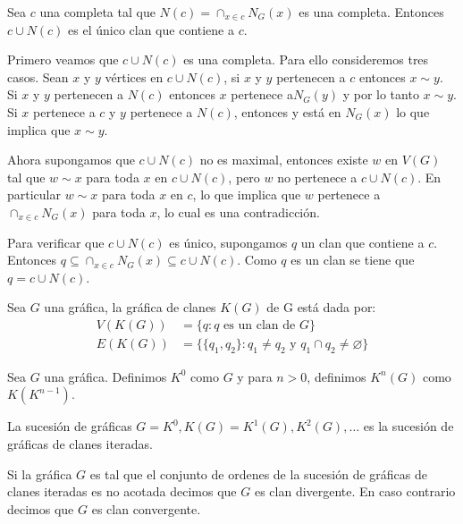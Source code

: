 \begin{Prop}
Sea $c$ una completa tal que $N(c) = \cap_{x\in c}N_G(x)$ es una completa. Entonces $c\cup N(c)$ es el único clan que contiene a $c$.
\end{Prop}
\begin{Dem}
Primero veamos que $c\cup N(c)$ es una completa. Para ello consideremos tres casos. Sean $x$ y $y$ vértices en $c\cup N(c)$, si $x$ y $y$ pertenecen a $c$ entonces $x\sim y$. Si $x$ y $y$ pertenecen a $N(c)$ entonces $x$ pertenece a$ N_G(y)$ y por lo tanto $x\sim y$. Si $x$ pertenece a $c$ y $y$ pertenece a $N(c)$, entonces y está en $N_G(x)$ lo que implica que $x\sim y$. 

Ahora supongamos que $c\cup N(c)$  no es maximal, entonces existe $w$ en $V(G)$ tal que $w\sim x$ para toda $x$ en $c\cup N(c)$, pero $w$ no pertenece a $c\cup N(c)$. En particular $w\sim x$ para toda $x$ en $c$, lo que implica que $w$ pertenece a $\cap_{x\in c}N_G(x)$ para toda $x$, lo cual es una contradicción.

Para verificar que $c\cup N(c)$ es único, supongamos $q$ un clan que contiene a $c$. Entonces $q\subseteq \cap_{x\in c}N_G(x)\subseteq c\cup N(c) $. Como $q$ es un clan se tiene que $q = c\cup N(c)$.
\end{Dem}

\begin{Defi}
Sea $G$ una gráfica, la gráfica de clanes $K(G)$ de G está dada por:
\begin{align*}
V(K(G))&=\{q: q \text{ es un clan de } G\} \\
E(K(G))&=\{\{q_1,q_2\}: q_1\neq q_2 \text{ y } q_1\cap q_2 \neq \varnothing \}
\end{align*}
\end{Defi}

\begin{Defi}
Sea $G$ una gráfica. Definimos $K^{0}$ como $G$ y para $n>0$, definimos $K^n(G)$ como $K(K^{n-1})$.

La sucesión de gráficas $G = K^{0}, K(G) = K^1(G), K^2(G),\ldots$ es la sucesión de gráficas de clanes iteradas. 
\end{Defi}

\begin{Defi}
Si la gráfica $G$ es tal que el conjunto de ordenes de la sucesión de gráficas de clanes iteradas es no acotada decimos que $G$ es clan divergente.
En caso contrario decimos que $G$ es clan convergente.
\end{Defi}
